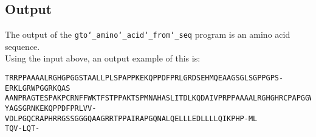 \subsection*{Output}

The output of the \texttt{gto\char`_amino\char`_acid\char`_from\char`_seq} program is an amino acid sequence.\\
Using the input above, an output example of this is:
\begin{lstlisting}
TRRPPAAAALRGHGPGGSTAALLPLSPAPPKEKQPPDFPRLGRDSEHMQEAAGSGLSGPPGPS-ERKLGRWPGGRKQAS
AANPRAGTESPAKPCRNFFWKTFSTPPAKTSPMNAHASLITDLKQDAIVPRPPAAAALRGHGHRCPAPGGWPHRPRQRA
YAGSGRNKEKQPPDFPRLVV-VDLPGQCRAPHRRGSSGGGQAAGRRTPPAIRAPGQNALQELLLEDLLLLQIKPHP-ML
TQV-LQT-
\end{lstlisting}
